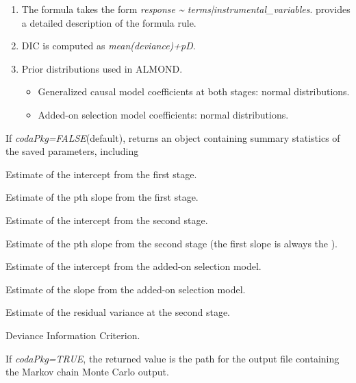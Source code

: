 \documentclass[a4paper]{book}
\begin{document}
%
\begin{Details}\relax
\begin{enumerate}

\item The formula takes the form \emph{response \textasciitilde{} terms|instrumental\_variables}.
 provides a detailed description of the formula rule.
\item DIC is computed as \emph{mean(deviance)+pD}.
\item Prior distributions used in ALMOND.
\begin{itemize}

\item Generalized causal model coefficients at both stages: normal distributions.
\item Added-on selection model coefficients: normal distributions.

\end{itemize}


\end{enumerate}

\end{Details}
%
\begin{Value}
If \emph{codaPkg=FALSE}(default), returns an object containing summary statistics of
the saved parameters, including
\begin{ldescription}
\item[\code{s1.intercept}] Estimate of the intercept from the first stage.
\item[\code{s1.slopeP}] Estimate of the pth slope from the first stage. 
\item[\code{s2.intercept}] Estimate of the intercept from the second stage.
\item[\code{s2.slopeP}] Estimate of the pth slope from the second stage (the first slope is always
the ).
\item[\code{select.intercept}] Estimate of the intercept from the added-on selection model.
\item[\code{select.slope}] Estimate of the slope from the added-on selection model.
\item[\code{var.e.s2}] Estimate of the residual variance at the second stage.
\item[\code{DIC}] Deviance Information Criterion.
\end{ldescription}
If \emph{codaPkg=TRUE}, the returned value is the path for the output file
containing the Markov chain Monte Carlo output.
\end{Value}
\end{document}
